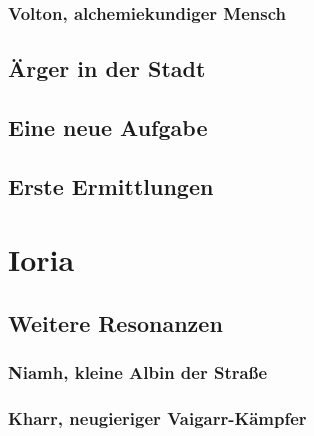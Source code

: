 \documentclass[a4paper]{scrreprt}
\begin{document}
\subsection{Volton, alchemiekundiger Mensch}

\section{Ärger in der Stadt}

\section{Eine neue Aufgabe}

\section{Erste Ermittlungen}


\chapter[Datum zweites Spiel]{Ioria}

\section{Weitere Resonanzen}
\subsection{Niamh, kleine Albin der Straße}
\subsection{Kharr, neugieriger Vaigarr-Kämpfer}
\end{document}
